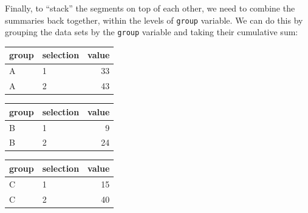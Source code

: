 \documentclass[
]{book}
\newenvironment{Shaded}{\begin{snugshade}}{\end{snugshade}}
\newcommand{\CommentTok}[1]{\textcolor[rgb]{0.56,0.35,0.01}{\textit{#1}}}
\newcommand{\ConstantTok}[1]{\textcolor[rgb]{0.56,0.35,0.01}{#1}}
\newcommand{\ControlFlowTok}[1]{\textcolor[rgb]{0.13,0.29,0.53}{\textbf{#1}}}
\newcommand{\FunctionTok}[1]{\textcolor[rgb]{0.13,0.29,0.53}{\textbf{#1}}}
\newcommand{\NormalTok}[1]{#1}
\newcommand{\OtherTok}[1]{\textcolor[rgb]{0.56,0.35,0.01}{#1}}
\newcommand{\SpecialCharTok}[1]{\textcolor[rgb]{0.81,0.36,0.00}{\textbf{#1}}}
\theoremstyle{definition}
\theoremstyle{definition}
\theoremstyle{definition}
\theoremstyle{definition}
\theoremstyle{remark}
\begin{document}
Finally, to ``stack'' the segments on top of each other, we need to combine the summaries back together, within the levels of \texttt{group} variable. We can do this by grouping the data sets by the \texttt{group} variable and taking their cumulative sum:

\begin{Shaded}
\end{Shaded}

\begin{table}
\begin{table}
\centering
\begin{tabular}{l|l|r}
\hline
group & selection & value\\
\hline
A & 1 & 33\\
\hline
A & 2 & 43\\
\hline
\end{tabular}
\end{table}\begin{table}
\centering
\begin{tabular}{l|l|r}
\hline
group & selection & value\\
\hline
B & 1 & 9\\
\hline
B & 2 & 24\\
\hline
\end{tabular}
\end{table}
\end{table}\begin{table}
\centering
\begin{tabular}{l|l|r}
\hline
group & selection & value\\
\hline
C & 1 & 15\\
\hline
C & 2 & 40\\
\hline
\end{tabular}
\end{table}
\end{document}
